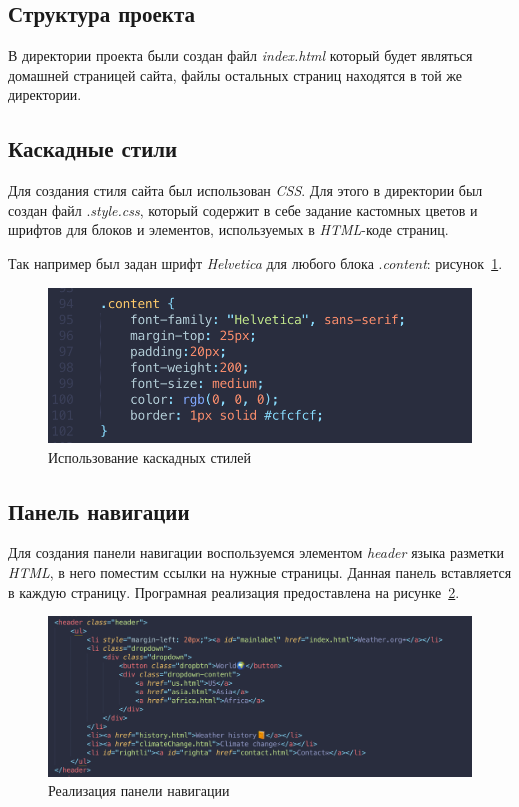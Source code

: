 \documentclass[a4paper,hidelinks,14pt]{extarticle}
\begin{document}
\subsection{Структура проекта}
В директории проекта были создан файл\textit{ index.html }который будет являться домашней страницей сайта, файлы остальных страниц находятся в той же директории.


\subsection{Каскадные стили}

Для создания стиля сайта был использован \textit{CSS}. Для этого в директории был создан файл .\textit{style.css}, который содержит в себе задание кастомных цветов и шрифтов для блоков и элементов, используемых в \textit{HTML}-коде страниц.

Так например был задан шрифт \textit{Helvetica} для любого блока .\textit{content}: рисунок~\ref{fig:fig2}.

\begin{figure}[htbp]
    \centering
    \includegraphics{fig/css.png}
    \caption{Использование каскадных стилей}
    \label{fig:fig2}
\end{figure}
\subsection{Панель навигации}
Для создания панели навигации воспользуемся элементом \textit{header} языка разметки \textit{HTML}, в него поместим ссылки на нужные страницы. Данная панель вставляется в каждую страницу. Програмная реализация предоставлена на рисунке~\ref{fig:fig1}.

\begin{figure}[htbp]
    \centering
    \includegraphics[scale=0.55]{fig/panel_navigatiob.png}
    \caption{Реализация панели навигации}
    \label{fig:fig1}
\end{figure}
\end{document}
